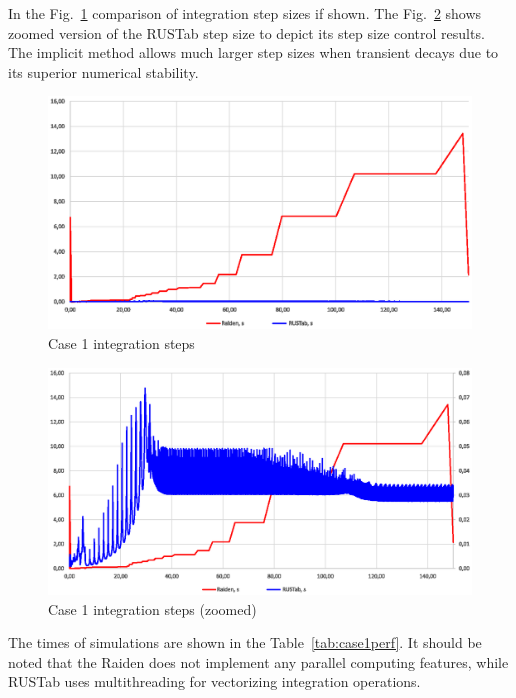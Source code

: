\documentclass[lettersize,journal]{IEEEtran}
\begin{document}
In the Fig.~\ref{case1step} comparison of integration step sizes if shown. The Fig.~\ref{case1stepz} shows zoomed version of the RUSTab step size to depict its step size control results. The implicit method allows much larger step sizes when transient decays due to its superior numerical stability.

\begin{figure}[htbp]
	\centering
	\includegraphics[width=.8\columnwidth]{case1step.eps}
	\caption{Case 1 integration steps}
	\label{case1step}
\end{figure}

\begin{figure}[htbp]
	\centering
	\includegraphics[width=.8\columnwidth]{case1stepz.eps}
	\caption{Case 1 integration steps (zoomed)}
	\label{case1stepz}
\end{figure}

The times of simulations are shown in the Table~\ref{tab:case1perf}.   It should be noted that the Raiden does not implement any parallel computing features, while RUSTab uses multithreading for vectorizing integration operations. 
\end{document}
